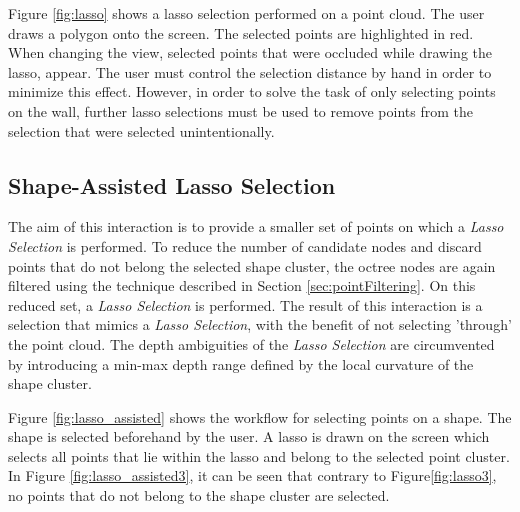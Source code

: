 Figure \ref{fig:lasso} shows a lasso selection performed on a point cloud. The user draws a polygon onto the screen. The selected points are highlighted in red. When changing the view, selected points that were occluded while drawing the lasso, appear. The user must control the selection distance by hand in order to minimize this effect. However, in order to solve the task of only selecting points on the wall, further lasso selections must be used to remove points from the selection that were selected unintentionally. 


\subsection{Shape-Assisted Lasso Selection}
The aim of this interaction is to provide a smaller set of points on which a \textit{Lasso Selection} is performed.  To reduce the number of candidate nodes and discard points that do not belong the selected shape cluster, the octree nodes are again filtered using the technique described in Section \ref{sec:pointFiltering}. On this reduced set, a \textit{Lasso Selection} is performed. The result of this interaction is a selection that mimics a \textit{Lasso Selection}, with the benefit of not selecting 'through' the point cloud. The depth ambiguities of the \textit{Lasso Selection} are circumvented by introducing a min-max depth range defined by the local curvature of the shape cluster. 

Figure \ref{fig:lasso_assisted} shows the workflow for selecting points on a shape. The shape is selected beforehand by the user. A lasso is drawn on the screen which selects all points that lie within the lasso and belong to the selected point cluster. In Figure \ref{fig:lasso_assisted3}, it can be seen that contrary to Figure\ref{fig:lasso3}, no points that do not belong to the shape cluster are selected. 

